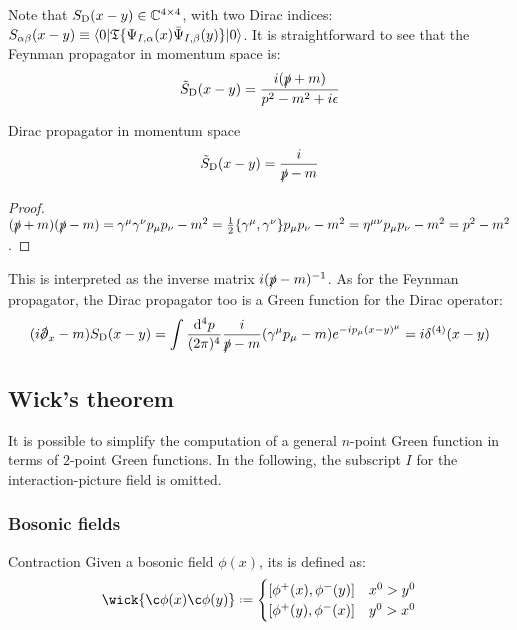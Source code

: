 Note that $ S_\text{D}(x - y) \in \mathbb{C}^{4 \times 4} $, with two Dirac indices: $ S_{\alpha \beta}(x-y) \equiv \braket{0 | \mathfrak{T}\{\Psi_{I,\alpha}(x) \bar{\Psi}_{I,\beta}(y)\} | 0} $. It is straightforward to see that the Feynman propagator in momentum space is:
\begin{equation}
  \tilde{S}_\text{D}(x-y) = \frac{i (\slashed{p} + m)}{p^2 - m^2 + i\epsilon}
\end{equation}

\begin{lemma}[before upper = {\tcbtitle}]{Dirac propagator in momentum space}{}
  \begin{equation}
    \tilde{S}_\text{D}(x-y) = \frac{i}{\slashed{p} - m}
  \end{equation}
\end{lemma}

\begin{proofbox}
  \begin{proof}
    $ (\slashed{p} + m) (\slashed{p} - m) = \gamma^\mu \gamma^\nu p_\mu p_\nu - m^2 = \frac{1}{2} \{\gamma^\mu , \gamma^\nu\} p_\mu p_\nu - m^2 = \eta^{\mu \nu} p_\mu p_\nu - m^2 = p^2 - m^2 $.
  \end{proof}
\end{proofbox}

This is interpreted as the inverse matrix $ i (\slashed{p} - m)^{-1} $.
As for the Feynman propagator, the Dirac propagator too is a Green function for the Dirac operator:
\begin{equation*}
  (i \slashed{\pa}_x - m) S_\text{D}(x-y) = \int \frac{\dd^4p}{(2\pi)^4} \frac{i}{\slashed{p} - m} (\gamma^\mu p_\mu - m) e^{-i p_\mu (x-y)^\mu} = i \delta^{(4)}(x - y)
\end{equation*}

\subsection{Wick's theorem}

It is possible to simplify the computation of a general $ n $-point Green function in terms of $ 2 $-point Green functions. In the following, the subscript $ I $ for the interaction-picture field is omitted.

\subsubsection{Bosonic fields}

\begin{definition}{Contraction}{}
  Given a bosonic field $ \phi(x) $, its  is defined as:
  \begin{equation}
    \wick{\c\phi(x) \c\phi(y)} \defeq
    \begin{cases}
      [\phi^+(x) , \phi^-(y)] & x^0 > y^0 \\
      [\phi^+(y) , \phi^-(x)] & y^0 > x^0
    \end{cases}
  \end{equation}
\end{definition}

